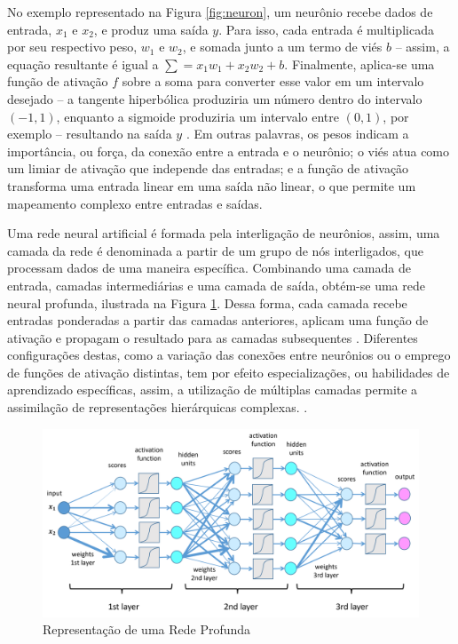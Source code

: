 No exemplo representado na Figura \ref{fig:neuron}, um neurônio recebe dados de entrada, $x_1$ e $x_2$, e produz uma saída $y$. Para isso, cada entrada é multiplicada por seu respectivo peso, $w_1$ e $w_2$, e somada junto a um termo de viés $b$ -- assim, a equação resultante é igual a $\sum = x_1 w_1 + x_2 w_2 + b$. Finalmente, aplica-se uma função de ativação $f$ sobre a soma para converter esse valor em um intervalo desejado -- a tangente hiperbólica produziria um número dentro do intervalo $(-1, 1)$, enquanto a sigmoide produziria um intervalo entre $(0, 1)$, por exemplo -- resultando na saída $y$ \cite{deeplearningbook}. Em outras palavras, os pesos indicam a importância, ou força, da conexão entre a entrada e o neurônio; o viés atua como um limiar de ativação que independe das entradas; e a função de ativação transforma uma entrada linear em uma saída não linear, o que permite um mapeamento complexo entre entradas e saídas. 

Uma rede neural artificial é formada pela interligação de neurônios, assim, uma camada da rede é denominada a partir de um grupo de nós interligados, que processam dados de uma maneira específica. Combinando uma camada de entrada, camadas intermediárias e uma camada de saída, obtém-se uma rede neural profunda, ilustrada na Figura \ref{fig:dnn}. Dessa forma, cada camada recebe entradas ponderadas a partir das camadas anteriores, aplicam uma função de ativação e propagam o resultado para as camadas subsequentes \cite{deeplearningbook}. Diferentes configurações destas, como a variação das conexões entre neurônios ou o emprego de funções de ativação distintas, tem por efeito especializações, ou habilidades de aprendizado específicas, assim, a utilização de múltiplas camadas permite a assimilação de representações hierárquicas complexas. \cite{reviewdeep}.

\begin{figure}[H]
	\caption{\label{fig:dnn}Representação de uma Rede Profunda}
    \begin{center}
    \includegraphics[width=1\linewidth]{images/dnn.png}
	\end{center}
\end{figure}


